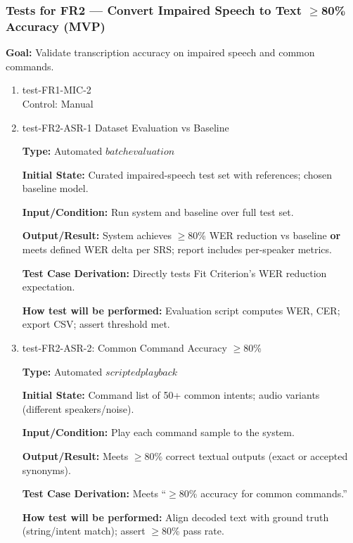 \documentclass[12pt, titlepage]{article}
\begin{document}
\subsubsection{Tests for FR2 — Convert Impaired Speech to Text $\geq$80\% Accuracy (MVP)}
\textbf{Goal:} Validate transcription accuracy on impaired speech and common commands.


\begin{enumerate}
\item{test-FR1-MIC-2\\}
Control: Manual

\item{test-FR2-ASR-1 Dataset Evaluation vs Baseline\\}

\textbf{Type:} Automated \(batch evaluation\)

\textbf{Initial State:} Curated impaired-speech test set with references; chosen baseline model.

\textbf{Input/Condition:} Run system and baseline over full test set.

\textbf{Output/Result:} System achieves $\geq$80\% WER reduction vs baseline \textbf{or} meets defined WER delta per SRS; report includes per-speaker metrics.

\textbf{Test Case Derivation:} Directly tests Fit Criterion’s WER reduction expectation.

\textbf{How test will be performed:} Evaluation script computes WER, CER; export CSV; assert threshold met.

\item{test-FR2-ASR-2: Common Command Accuracy $\geq$80\%\\}

\textbf{Type:} Automated \(scripted playback\)

\textbf{Initial State:} Command list of 50+ common intents; audio variants (different speakers/noise).

\textbf{Input/Condition:} Play each command sample to the system.

\textbf{Output/Result:} Meets $\geq$80\% correct textual outputs (exact or accepted synonyms).

\textbf{Test Case Derivation:} Meets “$\geq$80\% accuracy for common commands.”

\textbf{How test will be performed:} Align decoded text with ground truth (string/intent match); assert $\geq$80\% pass rate.

\end{enumerate}
\end{document}
